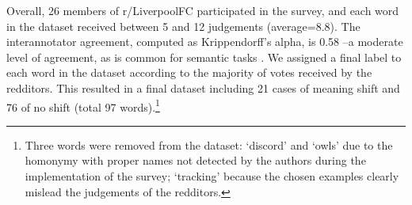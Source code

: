 Overall, 26 members of r/LiverpoolFC participated in the survey, and
each word in the dataset received between 5 and 12 judgements
(average=8.8). The interannotator agreement, computed as
Krippendorff's alpha, is
0.58 --a moderate level of
agreement, as is common for semantic tasks \cite{artstein2008inter}. We assigned a
final label to each word in the dataset according to the majority of
votes received by the redditors. This resulted in a final dataset
including 21 cases of meaning shift and 76 of no shift (total 97
words).\footnote{Three words were removed from the dataset: `discord'
  and `owls' due to the homonymy with proper names not detected by the
  authors during the implementation of the survey; `tracking' because
  the chosen examples clearly mislead the judgements of the
  redditors.}

%

